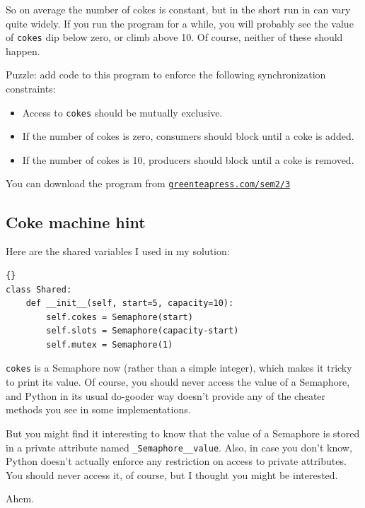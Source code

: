 \documentclass{book}
\newcommand{\shortlink}[1]{\href{https://greenteapress.com/sem2/#1}{\nolinkurl{greenteapress.com/sem2/#1}}}
\newcommand{\clearemptydoublepage}{\newpage\cleardoublepage}
\begin{document}
So on average the number of cokes is constant, but in the short
run in can vary quite widely.  If you run the program for a
while, you will probably see the value of {\tt cokes} dip
below zero, or climb above 10.  Of course, neither of these
should happen.

Puzzle: add code to this program to enforce the following
synchronization constraints:

\begin{itemize}

\item Access to {\tt cokes} should be mutually exclusive.

\item If the number of cokes is zero, consumers should block
until a coke is added.

\item If the number of cokes is 10, producers should block
until a coke is removed.

\end{itemize}

You can download the program from
\shortlink{3}


\clearemptydoublepage
\subsection {Coke machine hint}

Here are the shared variables I used in my solution:

\begin{lstlisting}[title={}]{}
class Shared:
    def __init__(self, start=5, capacity=10):
        self.cokes = Semaphore(start)
        self.slots = Semaphore(capacity-start)
        self.mutex = Semaphore(1)
\end{lstlisting}

{\tt cokes} is a Semaphore now (rather than a simple integer), 
which makes it tricky to print its value.  Of course, you
should never access the value of a Semaphore, and Python in
its usual do-gooder way doesn't provide any of the cheater
methods you see in some implementations.

But you might find it interesting to know that the value
of a Semaphore is stored in a private attribute named
{\tt \_Semaphore\_\_value}.  Also, in case you don't know,
Python doesn't actually enforce any restriction on access to
private attributes.  You should never access it, of course,
but I thought you might be interested.

Ahem.
\end{document}

